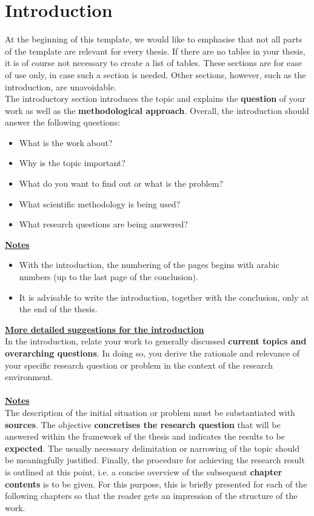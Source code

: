 \section{Introduction}\label{sec:introduction}

At the beginning of this template, we would like to emphasise that not all parts of the template are relevant for every thesis. If there are no tables in your thesis, it is of course not necessary to create a list of tables. These sections are for ease of use only, in case such a section is needed. Other sections, however, such as the introduction, are unavoidable.\\

The introductory section introduces the topic and explains the \textbf{question} of your work as well as the \textbf{methodological approach}. Overall, the introduction should answer the following questions: 
\begin{itemize}
    \item What is the work about?
    \item Why is the topic important?
    \item What do you want to find out or what is the problem?
    \item What scientific methodology is being used?
    \item What research questions are being answered?
\end{itemize}

\textbf{\uline{Notes}}
\begin{itemize}
 \item With the introduction, the numbering of the pages begins with arabic numbers (up to the last page of the conclusion).
    \item It is advisable to write the introduction, together with the conclusion, only at the end of the thesis.
\end{itemize}

\textbf{\uline{More detailed suggestions for the introduction}}
\\
In the introduction, relate your work to generally discussed \textbf{current topics and overarching questions}. In doing so, you derive the rationale and relevance of your specific research question or problem in the context of the research environment.\\
\\
\textbf{\uline{Notes}}
\\
The description of the initial situation or problem must be substantiated with \textbf{sources}. The objective \textbf{concretises the research question} that will be answered within the framework of the thesis and indicates the results to be \textbf{expected}. The usually necessary delimitation or narrowing of the topic should be meaningfully justified. Finally, the procedure for achieving the research result is outlined at this point, i.e. a concise overview of the subsequent \textbf{chapter contents} is to be given. For this purpose, this is briefly presented for each of the following chapters so that the reader gets an impression of the structure of the work.
